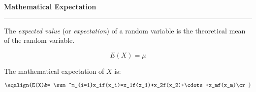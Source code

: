 \nopagenumbers
{\bf Mathematical Expectation}
\vskip 1mm
\hrule

\vskip 6pt
The {\it expected value} (or {\it expectation}) of a random variable is the theoretical mean of the random variable.


$$E(X)=\mu$$

The mathematical expectation of $X$ is:

$$\eqalign{E(X)&= \sum^m_{i=1}x_if(x_i)=x_1f(x_1)+x_2f(x_2)+\cdots+x_mf(x_m)\cr}$$

\vskip 1mm





\filbreak


\vfill\eject
\bye

